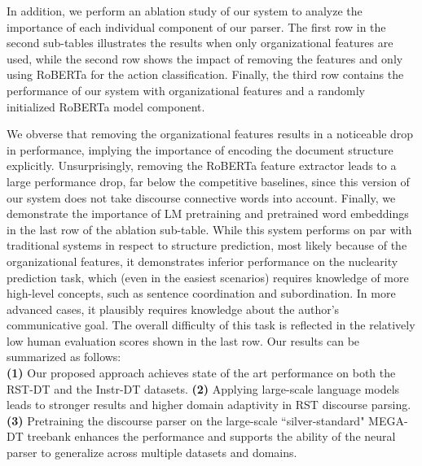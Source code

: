 \documentclass[11pt]{article}
\begin{document}
In addition, we perform an ablation study of our system to analyze the importance of each individual component of our parser. The first row in the second sub-tables illustrates the results when only organizational features are used, while the second row shows the impact of removing the features and only using RoBERTa for the action classification. Finally, the third row contains the performance of our system with organizational features and a randomly initialized RoBERTa model component. 

We obverse that removing the organizational features results in a noticeable drop in performance, implying the importance of encoding the document structure explicitly. Unsurprisingly, removing the RoBERTa feature extractor leads to a large performance drop, far below the competitive baselines, since this version of our system does not take discourse connective words into account. Finally, we demonstrate the importance of LM pretraining and pretrained word embeddings in the last row of the ablation sub-table. While this system performs on par with traditional systems in respect to structure prediction, most likely because of the organizational features, it demonstrates inferior performance on the nuclearity prediction task, which (even in the easiest scenarios) requires knowledge of more high-level concepts, such as sentence coordination and subordination. In more advanced cases, it plausibly requires knowledge about the author's communicative goal. The overall difficulty of this task is reflected in the relatively low human evaluation scores shown in the last row. Our results can be summarized as follows:\\
\textbf{(1)} Our proposed approach achieves state of the art performance on both the RST-DT and the Instr-DT datasets. \textbf{(2)} Applying large-scale language models leads to stronger results and higher domain adaptivity in RST discourse parsing. \textbf{(3)} Pretraining the discourse parser on the large-scale ``silver-standard" MEGA-DT treebank enhances the performance and supports the ability of the neural parser to generalize across multiple datasets and domains.\\
\end{document}

